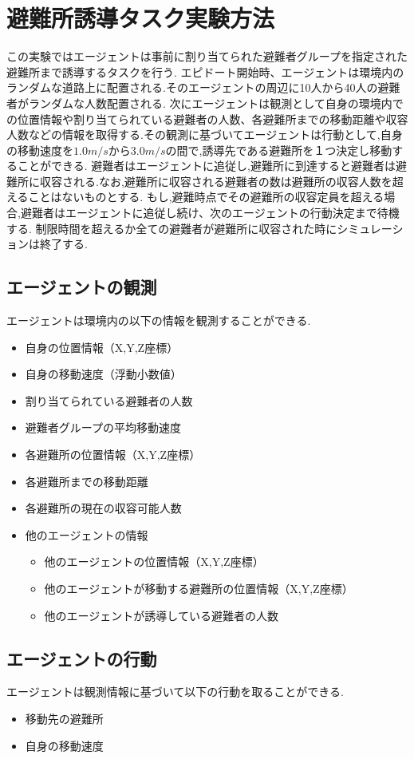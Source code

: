 \section{避難所誘導タスク実験方法}
この実験ではエージェントは事前に割り当てられた避難者グループを指定された避難所まで誘導するタスクを行う.
エピドート開始時、エージェントは環境内のランダムな道路上に配置される.そのエージェントの周辺に10人から40人の避難者がランダムな人数配置される.
次にエージェントは観測として自身の環境内での位置情報や割り当てられている避難者の人数、各避難所までの移動距離や収容人数などの情報を取得する.その観測に基づいてエージェントは行動として,自身の移動速度を$1.0m/s$から$3.0m/s$の間で,誘導先である避難所を１つ決定し移動することができる.
避難者はエージェントに追従し,避難所に到達すると避難者は避難所に収容される.なお,避難所に収容される避難者の数は避難所の収容人数を超えることはないものとする.
もし,避難時点でその避難所の収容定員を超える場合,避難者はエージェントに追従し続け、次のエージェントの行動決定まで待機する.
制限時間を超えるか全ての避難者が避難所に収容された時にシミュレーションは終了する.
\subsection{エージェントの観測}
エージェントは環境内の以下の情報を観測することができる.
\begin{itemize}
  \item 自身の位置情報（X,Y,Z座標）
  \item 自身の移動速度（浮動小数値）
  \item 割り当てられている避難者の人数
  \item 避難者グループの平均移動速度
  \item 各避難所の位置情報（X,Y,Z座標）
  \item 各避難所までの移動距離
  \item 各避難所の現在の収容可能人数
  \item 他のエージェントの情報
  \begin{itemize}
    \item 他のエージェントの位置情報（X,Y,Z座標）
    \item 他のエージェントが移動する避難所の位置情報（X,Y,Z座標）
    \item 他のエージェントが誘導している避難者の人数
  \end{itemize}
\end{itemize}
  
 
\subsection{エージェントの行動}
エージェントは観測情報に基づいて以下の行動を取ることができる.
\begin{itemize}
  \item 移動先の避難所
  \item 自身の移動速度
\end{itemize}


